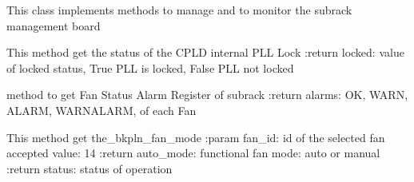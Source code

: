 \documentclass[letterpaper,10pt,english]{sphinxmanual}
\begin{document}
\begin{fulllineitems}
\label{\detokenize{apidocs:subrack_management_board.SubrackMngBoard}}
\pysigstartsignatures
{}
\pysigstopsignatures
\sphinxAtStartPar
This class implements methods to manage and to monitor the subrack management board

\begin{fulllineitems}
\label{\detokenize{apidocs:subrack_management_board.SubrackMngBoard.GetCPLDLockedPLL}}
\pysigstartsignatures
{}
\pysigstopsignatures
\sphinxAtStartPar
This method get the status of the CPLD internal PLL Lock
:return locked: value of locked status, True PLL is locked, False PLL not locked

\end{fulllineitems}


\begin{fulllineitems}
\label{\detokenize{apidocs:subrack_management_board.SubrackMngBoard.GetFanAlarm}}
\pysigstartsignatures
{}
\pysigstopsignatures
\sphinxAtStartPar
method to get Fan Status Alarm Register of subrack
:return alarms: OK, WARN, ALARM, WARN\sphinxhyphen{}ALARM, of each Fan

\end{fulllineitems}


\begin{fulllineitems}
\label{\detokenize{apidocs:subrack_management_board.SubrackMngBoard.GetFanMode}}
\pysigstartsignatures
{}
\pysigstopsignatures
\sphinxAtStartPar
This method get the\_bkpln\_fan\_mode
:param fan\_id: id of the selected fan accepted value: 1\sphinxhyphen{}4
:return auto\_mode: functional fan mode: auto or manual
:return status: status of operation


\end{fulllineitems}
\end{fulllineitems}
\end{document}
